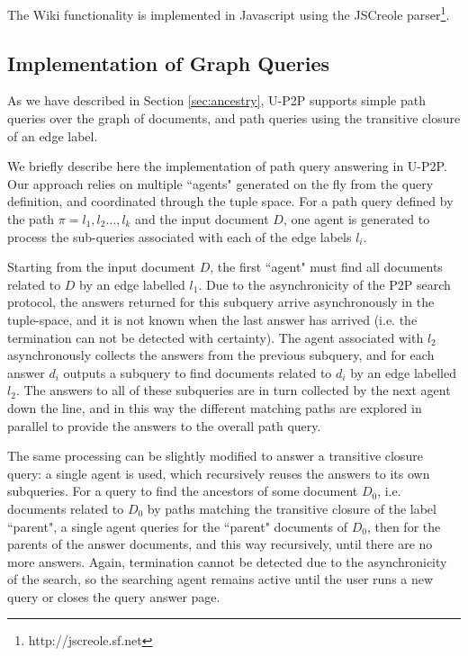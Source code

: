 The Wiki functionality is implemented in Javascript using the JSCreole parser\footnote{http://jscreole.sf.net}.

\subsection{Implementation of Graph Queries}

As we have described in Section \ref{sec:ancestry}, U-P2P supports simple path queries over the graph of documents, and path queries using the transitive closure of an edge label.

We briefly describe here the implementation of path query answering in U-P2P. Our approach relies on multiple ``agents" generated on the fly from the query definition, and coordinated through the tuple space. For a path query defined by the path $\pi = l_1,l_2 \dots, l_k$ and the input document $D$, one agent is generated to process the sub-queries associated with each of the edge labels $l_i$. 

Starting from the input document $D$, the first ``agent"  must find all documents related to $D$ by an edge labelled $l_1$. Due to the asynchronicity of the P2P search protocol, the answers returned for this subquery arrive asynchronously in the tuple-space, and it is not known when the last answer has arrived (i.e. the termination can not be detected with certainty). The agent associated with $l_2$ asynchronously collects the answers from the previous subquery, and for each answer $d_{i}$ outputs a subquery to find documents related to $d_{i}$ by an edge labelled $l_2$. The answers to all of these subqueries are in turn collected by the next agent down the line, and in this way the different matching paths are explored in parallel to provide the answers to the overall path query.

The same processing can be slightly modified to answer a transitive closure query: a single agent is used, which recursively reuses the answers to its own subqueries. For a query to find the ancestors of some document $D_0$, i.e. documents related to $D_0$ by paths matching the transitive closure of the label ``parent", a single agent queries for the ``parent" documents of $D_0$, then for the parents of the answer documents, and this way recursively, until there are no more answers. Again, termination cannot be detected due to the asynchronicity of the search, so the searching agent remains active until the user runs a new query or closes the query answer page.

